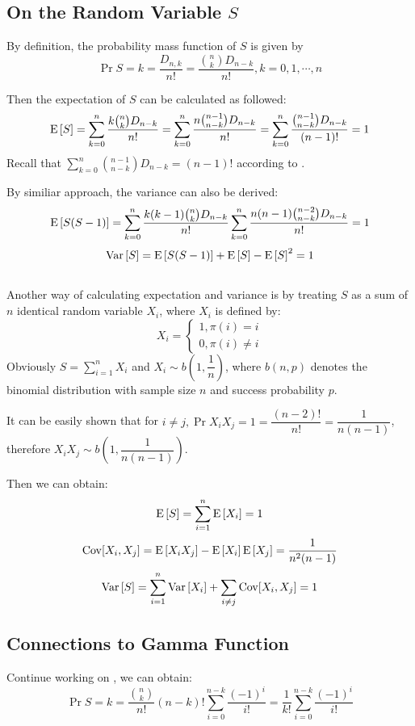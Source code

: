 \subsection{On the Random Variable $ S$}
\label{f-random}
By definition, the probability mass function of $ S$ is given by
  \begin{equation}
  \Pr{S=k} = \dfrac{D_{n,k}}{n!}=\dfrac{{n\choose{k}}D_{n-k}}{n!}, k = 0,1,\cdots ,n
  \label{eqn:f-pr}
  \end{equation}

Then the expectation of $ S$ can be calculated as followed:
\[ \E{S} = \sum_{k=0}^n\dfrac{k{n\choose{k}}D_{n-k}}{n!} = \sum_{k=0}^n\dfrac{n{n-1\choose{n-k}}D_{n-k}}{n!} =
  \sum_{k=0}^n\dfrac{{n-1\choose{n-k}}D_{n-k}}{(n-1)!} = 1 \]
Recall that $ \sum_{k=0}^n{n-1 \choose{n-k}}D_{n-k}=(n-1)!$ according to .

By similiar approach, the variance can also be derived:
\[ \E{S(S-1)} = \sum_{k=0}^n\dfrac{k(k-1){n\choose k}D_{n-k}}{n!}\sum_{k=0}^n\dfrac{n(n-1){n-2 \choose{n-k}}D_{n-k}}{n!} = 1\]
\[ \text{Var}\left[S\right] = \text{E}\left[S(S-1)\right] + \text{E}\left[S\right]-\text{E}\left[S\right]^2 = 1\]
\\

Another way of calculating expectation and variance is by treating $ S$ as a sum of $ n $ identical
random variable $ X_i$, where $ X_i$ is defined by:
\[ X_i = \begin{cases}1, \pi(i)=i\\0,\pi(i)\neq i\end{cases}\]
Obviously $ S = \sum_{i=1}^nX_i$ and $ X_i\sim b(1,\dfrac{1}{n})$, where $ b(n,p)$ denotes the
binomial distribution with sample size $ n$ and success probability $ p$.

It can be easily shown that for $ i\neq j, \Pr{X_iX_j=1}=\dfrac{(n-2)!}{n!}=\dfrac{1}{n(n-1)} $, therefore $X_iX_j \sim b(1, \dfrac{1}{n(n-1)})$.

Then we can obtain:
\[ \E{S} = \sum_{i=1}^n\E{X_i} = 1\]
\[ \operatorname{Cov}[X_i,X_j]=\text{E}\left[X_iX_j\right]-\text{E}\left[X_i\right]\text{E}\left[X_j\right]=\dfrac{1}{n^2(n-1)}\]
\[ \Var{S} = \sum_{i=1}^n\Var{X_i}+\sum_{i\neq j}\Cov[X_i,X_j] = 1\]

\subsection{Connections to Gamma Function}
Continue working on , we can obtain:
\[ \Pr{S=k} = \dfrac{{n\choose{k}}}{n!}(n-k)!\sum_{i=0}^{n-k}{\dfrac{(-1)^i}{i!}} = \dfrac{1}{k!}\sum_{i=0}^{n-k}\dfrac{(-1)^i}{i!}\]

